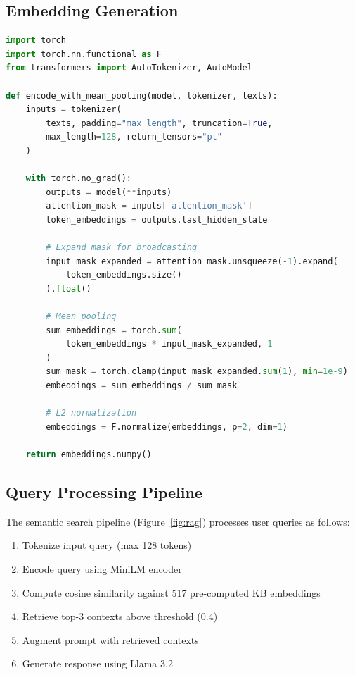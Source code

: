 \documentclass[11pt,a4paper]{article}
\begin{document}
\subsection{Embedding Generation}

\nopagebreak
\begin{lstlisting}[language=Python, caption={Mean pooling for sentence embeddings}]
import torch
import torch.nn.functional as F
from transformers import AutoTokenizer, AutoModel

def encode_with_mean_pooling(model, tokenizer, texts):
    inputs = tokenizer(
        texts, padding="max_length", truncation=True,
        max_length=128, return_tensors="pt"
    )
    
    with torch.no_grad():
        outputs = model(**inputs)
        attention_mask = inputs['attention_mask']
        token_embeddings = outputs.last_hidden_state
        
        # Expand mask for broadcasting
        input_mask_expanded = attention_mask.unsqueeze(-1).expand(
            token_embeddings.size()
        ).float()
        
        # Mean pooling
        sum_embeddings = torch.sum(
            token_embeddings * input_mask_expanded, 1
        )
        sum_mask = torch.clamp(input_mask_expanded.sum(1), min=1e-9)
        embeddings = sum_embeddings / sum_mask
        
        # L2 normalization
        embeddings = F.normalize(embeddings, p=2, dim=1)
    
    return embeddings.numpy()
\end{lstlisting}

\subsection{Query Processing Pipeline}

\nopagebreak
The semantic search pipeline (Figure~\ref{fig:rag}) processes user queries as follows:

\begin{enumerate}
    \item Tokenize input query (max 128 tokens)
    \item Encode query using MiniLM encoder
    \item Compute cosine similarity against 517 pre-computed KB embeddings
    \item Retrieve top-3 contexts above threshold (0.4)
    \item Augment prompt with retrieved contexts
    \item Generate response using Llama 3.2
\end{enumerate}
\end{document}
